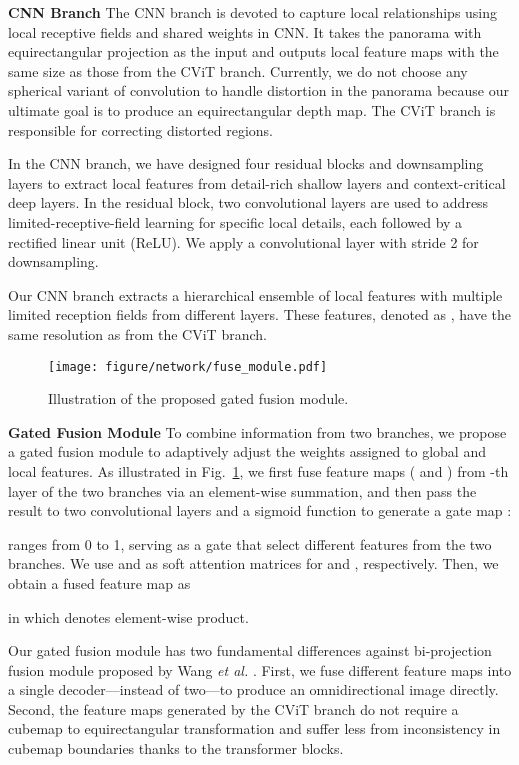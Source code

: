 \documentclass[10pt,twocolumn,letterpaper]{article}
\begin{document}
\textbf{CNN Branch }
The CNN branch is devoted to capture local relationships using local receptive fields and shared weights in CNN. It takes the panorama  with equirectangular projection as the input and outputs local feature maps  with the same size as those from the CViT branch. Currently, we do not choose any spherical variant of convolution to handle distortion in the panorama because our ultimate goal is to produce an equirectangular depth map. The CViT branch is responsible for correcting distorted regions.

In the CNN branch, we have designed four residual blocks\cite{He_2016_CVPR} and downsampling layers to extract local features from detail-rich shallow layers and context-critical deep layers. In the residual block, two  convolutional layers are used to address limited-receptive-field learning for specific local details, each followed by a rectified linear unit (ReLU). We apply a  convolutional layer with stride 2 for downsampling.

Our CNN branch extracts a hierarchical ensemble of local features with multiple limited reception fields from different layers. These features, denoted as , have the same resolution as  from the CViT branch.


\begin{figure}[t]
  \centering
   \texttt{[image: figure/network/fuse\_module.pdf]}
   \caption{Illustration of the proposed gated fusion module. 
}
   \label{fig:fuse_module}
\end{figure}

\textbf{Gated Fusion Module }
To combine information from two branches, we propose a gated fusion module to adaptively adjust the weights assigned to global and local features. As illustrated in Fig.~\ref{fig:fuse_module}, we first fuse feature maps ( and  ) from -th layer of the two branches via an element-wise summation, and then pass the result to two convolutional layers and a sigmoid function to generate a gate map :

 ranges from 0 to 1, serving as a gate that select different features from the two branches. We use  and  as soft attention matrices for  and , respectively. Then, we obtain a fused feature map  as

in which  denotes element-wise product.

Our gated fusion module has two fundamental differences against bi-projection fusion module proposed by Wang \emph{et al.} \cite{9157424}. First, we fuse different feature maps into a single decoder---instead of two---to produce an omnidirectional image directly. Second, the feature maps generated by the CViT branch do not require a cubemap to equirectangular transformation and suffer less from inconsistency in cubemap boundaries thanks to the transformer blocks.
\end{document}
